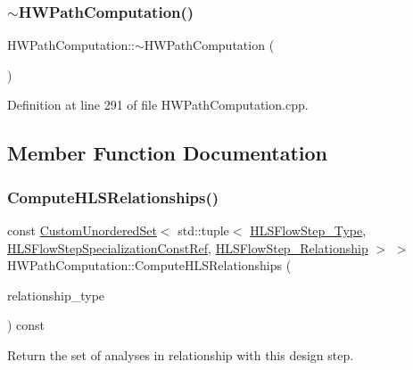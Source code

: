 \subsubsection{\texorpdfstring{$\sim$\+H\+W\+Path\+Computation()}{~HWPathComputation()}}
{\footnotesize\ttfamily H\+W\+Path\+Computation\+::$\sim$\+H\+W\+Path\+Computation (\begin{DoxyParamCaption}{ }\end{DoxyParamCaption})\hspace{0.3cm}{\ttfamily [virtual]}}



Definition at line 291 of file H\+W\+Path\+Computation.\+cpp.



\subsection{Member Function Documentation}
\mbox{\label{classHWPathComputation_ace7b922eaba88a8247ff44dd25ae3dbe}} 
\subsubsection{\texorpdfstring{Compute\+H\+L\+S\+Relationships()}{ComputeHLSRelationships()}}
{\footnotesize\ttfamily const \hyperlink{classCustomUnorderedSet}{Custom\+Unordered\+Set}$<$ std\+::tuple$<$ \hyperlink{hls__step_8hpp_ada16bc22905016180e26fc7e39537f8d}{H\+L\+S\+Flow\+Step\+\_\+\+Type}, \hyperlink{hls__step_8hpp_a5fdd2edf290c196531d21d68e13f0e74}{H\+L\+S\+Flow\+Step\+Specialization\+Const\+Ref}, \hyperlink{hls__step_8hpp_a3ad360b9b11e6bf0683d5562a0ceb169}{H\+L\+S\+Flow\+Step\+\_\+\+Relationship} $>$ $>$ H\+W\+Path\+Computation\+::\+Compute\+H\+L\+S\+Relationships (\begin{DoxyParamCaption}\item[{const \hyperlink{classDesignFlowStep_a723a3baf19ff2ceb77bc13e099d0b1b7}{Design\+Flow\+Step\+::\+Relationship\+Type}}]{relationship\+\_\+type }\end{DoxyParamCaption}) const\hspace{0.3cm}{\ttfamily [virtual]}}



Return the set of analyses in relationship with this design step. 


